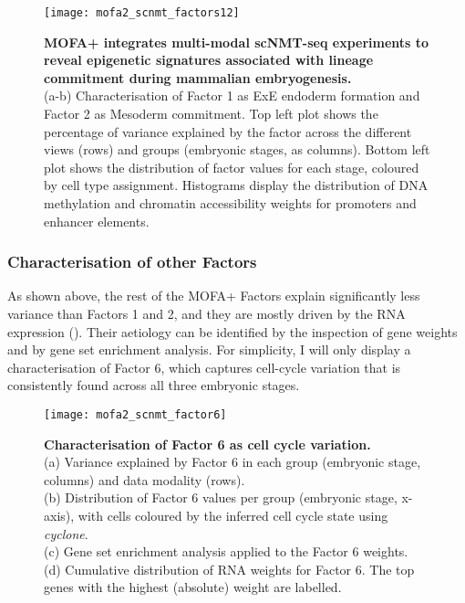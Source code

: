 \begin{figure}[H]
	\centering
	\texttt{[image: mofa2\_scnmt\_factors12]}
	\caption[]{
	\textbf{MOFA+ integrates multi-modal scNMT-seq experiments to reveal epigenetic signatures associated with lineage commitment during mammalian embryogenesis.} \\
	(a-b) Characterisation of Factor 1 as ExE endoderm formation and Factor 2 as Mesoderm commitment. Top left plot shows the percentage of variance explained by the factor across the different views (rows) and groups (embryonic stages, as columns). Bottom left plot shows the distribution of factor values for each stage, coloured by cell type assignment. Histograms display the distribution of DNA methylation and chromatin accessibility weights for promoters and enhancer elements.
	}
	\label{fig:mofa2_scnmt_factors12}
\end{figure}

\subsubsection{Characterisation of other Factors}

As shown above, the rest of the MOFA+ Factors explain significantly less variance than Factors 1 and 2, and they are mostly driven by the RNA expression (). Their aetiology can be identified by the inspection of gene weights and by gene set enrichment analysis. For simplicity, I will only display a characterisation of Factor 6, which captures cell-cycle variation that is consistently found across all three embryonic stages.

\begin{figure}[H]
	\centering
	\texttt{[image: mofa2\_scnmt\_factor6]}
	\caption[]{
	\textbf{Characterisation of Factor 6 as cell cycle variation.} \\
	(a) Variance explained by Factor 6 in each group (embryonic stage, columns) and data modality (rows).\\
	(b) Distribution of Factor 6 values per group (embryonic stage, x-axis), with cells coloured by the inferred cell cycle state using \textit{cyclone}.\\
	(c) Gene set enrichment analysis applied to the Factor 6 weights.\\
	(d) Cumulative distribution of RNA weights for Factor 6. The top genes with the highest (absolute) weight are labelled.
	}
	\label{fig:mofa2_scnmt_factor6}
\end{figure}

